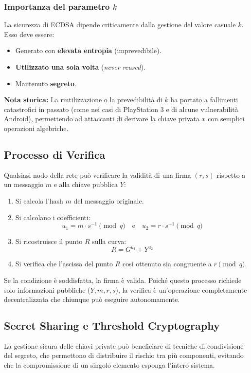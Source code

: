 \subsubsection*{Importanza del parametro $k$}
La sicurezza di ECDSA dipende criticamente dalla gestione del valore casuale $k$. Esso deve essere:
\begin{itemize}
    \item Generato con \textbf{elevata entropia} (imprevedibile).
    \item \textbf{Utilizzato una sola volta} (\textit{never reused}).
    \item Mantenuto \textbf{segreto}.
\end{itemize}
\textbf{Nota storica:} La riutilizzazione o la prevedibilità di $k$ ha portato a fallimenti catastrofici in passato (come nei casi di PlayStation 3 e di alcune vulnerabilità Android), permettendo ad attaccanti di derivare la chiave privata $x$ con semplici operazioni algebriche.

\subsection*{Processo di Verifica}
Qualsiasi nodo della rete può verificare la validità di una firma $(r, s)$ rispetto a un messaggio $m$ e alla chiave pubblica $Y$:

\begin{enumerate}
    \item Si calcola l'hash $m$ del messaggio originale.
    \item Si calcolano i coefficienti:
    \[ u_1 = m \cdot s^{-1} \pmod q \quad \text{e} \quad u_2 = r \cdot s^{-1} \pmod q \]
    \item Si ricostruisce il punto $R$ sulla curva:
    \[ R = G^{u_1} + Y^{u_2} \]
    \item Si verifica che l'ascissa del punto $R$ così ottenuto sia congruente a $r \pmod q$.
\end{enumerate}

Se la condizione è soddisfatta, la firma è valida. Poiché questo processo richiede solo informazioni pubbliche ($Y, m, r, s$), la verifica è un'operazione completamente decentralizzata che chiunque può eseguire autonomamente.

\subsection{Secret Sharing e Threshold Cryptography}

La gestione sicura delle chiavi private può beneficiare di tecniche di condivisione del segreto, che permettono di distribuire il rischio tra più componenti, evitando che la compromissione di un singolo elemento esponga l'intero sistema.

